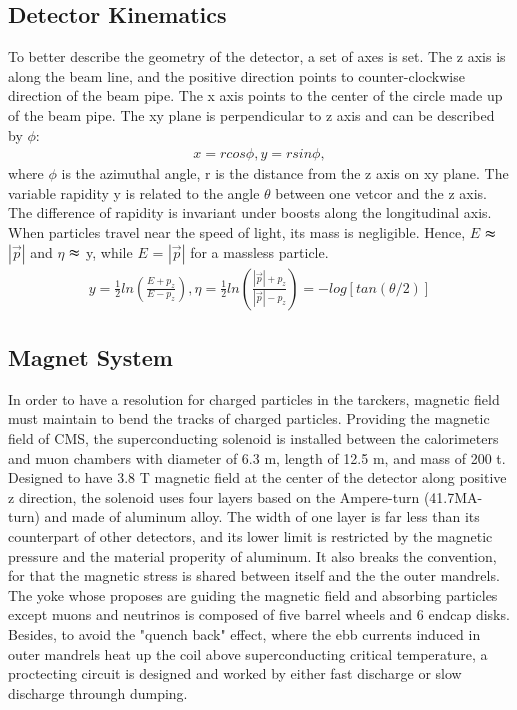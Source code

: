 \subsection{Detector Kinematics} 
To better describe the geometry of the detector, a set of axes is set. The z axis is along the beam line, and the positive direction points to counter-clockwise direction of the beam pipe. The x axis points to the center of the circle made up of the beam pipe. The xy plane is perpendicular to z axis and can be described by $\phi $:
\begin{equation} \label{eq1}
\begin{split}
x=rcos\phi, y=rsin\phi,
\end{split}
\end{equation}
where $\phi$ is the azimuthal angle, r is the distance from the z axis on xy plane. The variable rapidity y is related to the angle $\theta$ between one vetcor and the z axis. The difference of rapidity is invariant under boosts along the longitudinal axis. When particles travel near the speed of light, its mass is negligible. Hence, $E$ $\thickapprox$ $|\vec{p}|$ and $\eta$ $\thickapprox$ y, while $E$ = $|\vec{p}|$ for a massless particle.
\begin{equation} \label{eq1}
\begin{split}
y = \frac{1}{2} ln( \frac{E+p_z}{E-p_z} ), \eta = \frac{1}{2} ln( \frac{|\vec{p}|+p_z}{|\vec{p}|-p_z} ) = -log[tan(\theta /2)]
\end{split}
\end{equation}

\subsection{Magnet System} 
In order to have a resolution for charged particles in the tarckers, magnetic field must maintain to bend the tracks of charged particles. 
Providing the magnetic field of CMS, the superconducting solenoid is installed between the calorimeters and muon chambers with diameter of 6.3 m, length of 12.5 m, and mass of 200 t. 
Designed to have 3.8 T magnetic field at the center of the detector along positive z direction, the solenoid uses four layers based on the Ampere-turn (41.7MA-turn) and made of aluminum alloy.
The width of one layer is far less than its counterpart of other detectors, and its lower limit is restricted by the magnetic pressure and the material properity of aluminum.
It also breaks the convention, for that the magnetic stress is shared between itself and the the outer mandrels. 
The yoke whose proposes are guiding the magnetic field and absorbing particles except muons and neutrinos is composed of five barrel wheels and 6 endcap disks\citep{yoke}. 
Besides, to avoid the "quench back" effect, where the ebb currents induced in outer mandrels heat up the coil above superconducting critical temperature, 
a proctecting circuit is designed and worked by either fast discharge or slow discharge throungh dumping. 

